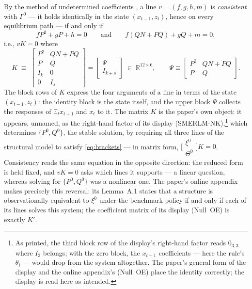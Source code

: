 \documentclass[11pt]{article}
\theoremstyle{remark}
\newcommand{\E}{\mathbb{E}}
\newcommand{\R}{\mathbb{R}}
\begin{document}
By the method of undetermined coefficients \citep{Uhlig1995}, a line $v=(f,g,h,m)$ is \emph{consistent} with $\Gamma^0$ --- it holds identically in the state $(x_{t-1},z_t)$, hence on every equilibrium path --- if and only if
\begin{equation}\label{eq:brackets}
fP^2+gP+h=0 \qquad\text{and}\qquad f(QN+PQ)+gQ+m=0 ,
\end{equation}
i.e., $vK=0$ where
\begin{equation*}
K \;\equiv\;
\begin{bmatrix}
P^2 & QN+PQ\\
P & Q\\
I_k & 0\\
0 & I_s
\end{bmatrix}
=\begin{bmatrix}\Psi\\ I_{k+s}\end{bmatrix} \;\in\;\R^{12\times 6} , \qquad \Psi\equiv
\begin{bmatrix}
P^2 & QN+PQ\\
P & Q
\end{bmatrix} .
\end{equation*}
The block rows of $K$ express the four arguments of a line in terms of the state $(x_{t-1},z_t)$: the identity block is the state itself, and the upper block $\Psi$ collects the responses of $\E_tx_{t+1}$ and $x_t$ to it. The matrix $K$ is the paper's own object: it appears, unnamed, as the right-hand factor of its display (SMERLM-NK),\footnote{As printed, the third block row of the display's right-hand factor reads $0_{3,3}$ where $I_3$ belongs; with the zero block, the $x_{t-1}$ coefficients --- here the rule's $\theta_i$ --- would drop from the system altogether. The paper's general form of the display and the online appendix's (Null~OE) place the identity correctly; the display is read here as intended.} which determines $\{P^0,Q^0\}$, the stable solution, by requiring all three lines of the structural model to satisfy \eqref{eq:brackets} --- in matrix form, $\bigl[\begin{smallmatrix}\xi^0\\ \Theta^0\end{smallmatrix}\bigr]K=0$. Consistency reads the same equation in the opposite direction: the reduced form is held fixed, and $vK=0$ asks which lines it supports --- a linear question, whereas solving for $\{P^0,Q^0\}$ was a nonlinear one. The paper's online appendix makes precisely this reversal: its Lemma~A.1 states that a structure is observationally equivalent to $\xi^0$ under the benchmark policy if and only if each of its lines solves this system; the coefficient matrix of its display (Null~OE) is exactly $K'$.
\end{document}
